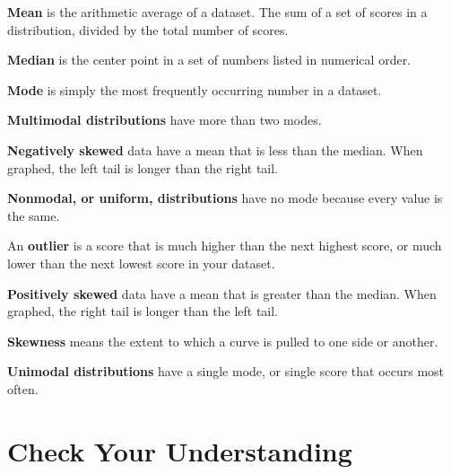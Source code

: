 \documentclass[
  letterpaper,
  DIV=11,
  numbers=noendperiod]{scrreprt}
\begin{document}
\textbf{Mean} is the arithmetic average of a dataset. The sum of a set
of scores in a distribution, divided by the total number of scores.

\textbf{Median} is the center point in a set of numbers listed in
numerical order.

\textbf{Mode} is simply the most frequently occurring number in a
dataset.

\textbf{Multimodal distributions} have more than two modes.

\textbf{Negatively skewed} data have a mean that is less than the
median. When graphed, the left tail is longer than the right tail.

\textbf{Nonmodal, or uniform, distributions} have no mode because every
value is the same.

An \textbf{outlier} is a score that is much higher than the next highest
score, or much lower than the next lowest score in your dataset.

\textbf{Positively skewed} data have a mean that is greater than the
median. When graphed, the right tail is longer than the left tail.

\textbf{Skewness} means the extent to which a curve is pulled to one
side or another.

\textbf{Unimodal distributions} have a single mode, or single score that
occurs most often.

\section*{Check Your Understanding}\label{check-your-understanding-2}

\end{document}
